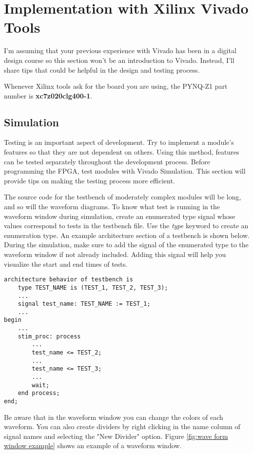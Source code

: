 \documentclass[]{report}
\begin{document}
\section{Implementation with Xilinx Vivado Tools}

I'm assuming that your previous experience with Vivado has been in a digital design course so this section won't be an introduction to Vivado. Instead, I'll share tips that could be helpful in the design and testing process.

Whenever Xilinx tools ask for the board you are using, the PYNQ-Z1 part number is \textbf{xc7z020clg400-1}.

\subsection{Simulation}
Testing is an important aspect of development. Try to implement a module's features so that they are not dependent on others. Using this method, features can be tested separately throughout the development process. Before programming the FPGA, test modules with Vivado Simulation. This section will provide tips on making the testing process more efficient.

The source code for the testbench of moderately complex modules will be long, and so will the waveform diagrams. To know what test is running in the waveform window during simulation, create an enumerated type signal whose values correspond to tests in the testbench file. Use the \textit{type} keyword to create an enumeration type. An example architecture section of a testbench is shown below. During the simulation, make sure to add the signal of the enumerated type to the waveform window if not already included. Adding this signal will help you visualize the start and end times of tests.

\begin{verbatim}
architecture behavior of testbench is
    type TEST_NAME is (TEST_1, TEST_2, TEST_3);
    ...
	signal test_name: TEST_NAME := TEST_1;
	...
begin
    ...
    stim_proc: process
    	...
    	test_name <= TEST_2;
    	...
    	test_name <= TEST_3;
    	...
    	wait;
    end process;
end;
\end{verbatim}

Be aware that in the waveform window you can change the colors of each waveform. You can also create dividers by right clicking in the name column of signal names and selecting the "New Divider" option. Figure \ref{fig:wave form window example} shows an example of a waveform window.
\end{document}
